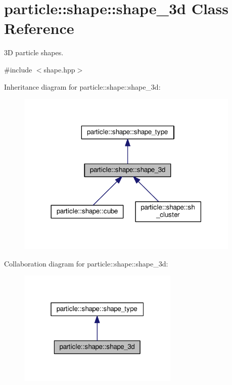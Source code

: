 \hypertarget{classparticle_1_1shape_1_1shape__3d}{}\section{particle\+:\+:shape\+:\+:shape\+\_\+3d Class Reference}
\label{classparticle_1_1shape_1_1shape__3d}


3D particle shapes.  




{\ttfamily \#include $<$shape.\+hpp$>$}



Inheritance diagram for particle\+:\+:shape\+:\+:shape\+\_\+3d\+:\nopagebreak
\begin{figure}[H]
\begin{center}
\leavevmode
\includegraphics[width=302pt]{d4/dbf/classparticle_1_1shape_1_1shape__3d__inherit__graph}
\end{center}
\end{figure}


Collaboration diagram for particle\+:\+:shape\+:\+:shape\+\_\+3d\+:\nopagebreak
\begin{figure}[H]
\begin{center}
\leavevmode
\includegraphics[width=217pt]{d1/d61/classparticle_1_1shape_1_1shape__3d__coll__graph}
\end{center}
\end{figure}
